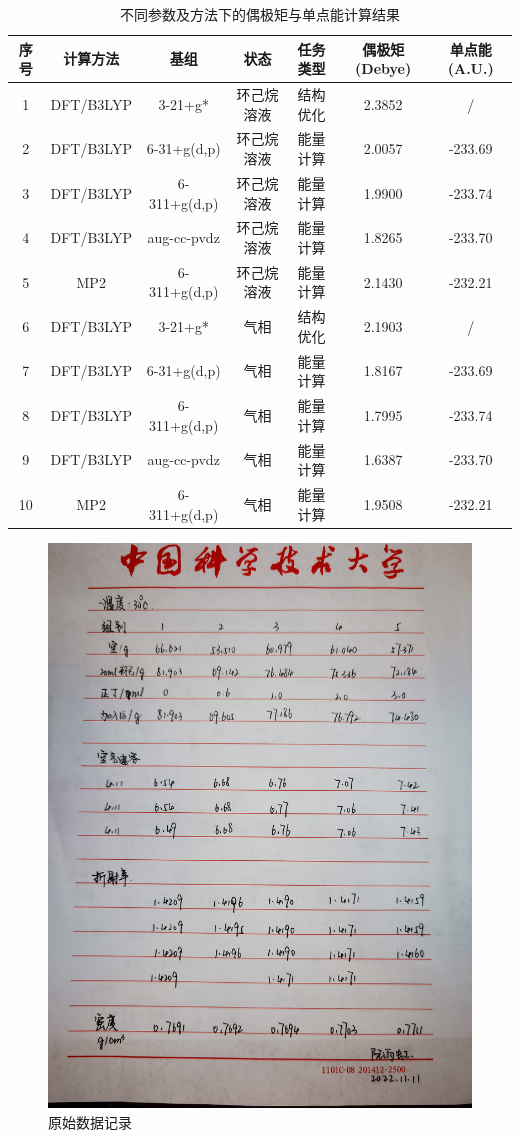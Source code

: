 \documentclass[12pt]{ctexart}
\numberwithin{equation}{section}
\begin{document}
\begin{longtable}{ccccccc}
    \caption{不同参数及方法下的偶极矩与单点能计算结果} \\
    \hline
    序号 & 计算方法 & 基组 & 状态 & 任务类型 & 偶极矩(Debye)
        & 单点能(A.U.) \\
    \hline
     1 & DFT/B3LYP &   3-21+g*    & 环己烷溶液 & 结构优化 & 2.3852 & / \\
     2 & DFT/B3LYP & 6-31+g(d,p)  & 环己烷溶液 & 能量计算 & 2.0057 & -233.69 \\
     3 & DFT/B3LYP & 6-311+g(d,p) & 环己烷溶液 & 能量计算 & 1.9900 & -233.74 \\
     4 & DFT/B3LYP & aug-cc-pvdz  & 环己烷溶液 & 能量计算 & 1.8265 & -233.70 \\
     5 &    MP2    & 6-311+g(d,p) & 环己烷溶液 & 能量计算 & 2.1430 & -232.21 \\
     6 & DFT/B3LYP &   3-21+g*    &    气相   & 结构优化 & 2.1903 & / \\
     7 & DFT/B3LYP & 6-31+g(d,p)  &    气相   & 能量计算 & 1.8167 & -233.69 \\
     8 & DFT/B3LYP & 6-311+g(d,p) &    气相   & 能量计算 & 1.7995 & -233.74 \\
     9 & DFT/B3LYP & aug-cc-pvdz  &    气相   & 能量计算 & 1.6387 & -233.70 \\
    10 &    MP2    & 6-311+g(d,p) &    气相   & 能量计算 & 1.9508 & -232.21 \\
    \hline
\end{longtable}

\pagebreak

\begin{figure}[ht]
    \centering
    \includegraphics[width=1\textwidth]{data.jpg}
    \caption{原始数据记录}
    \label{fig:data}
\end{figure}
\end{document}
